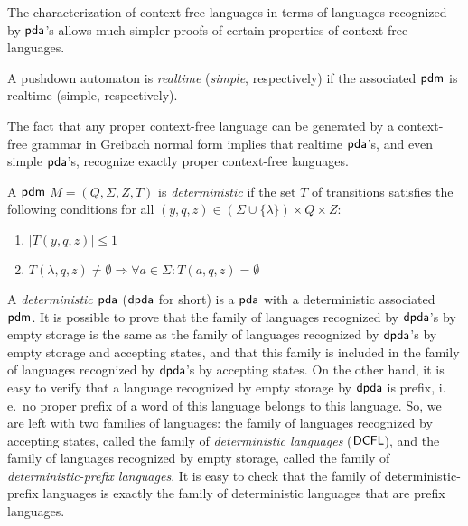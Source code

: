 The characterization of context-free languages in terms of languages recognized by \index{$\pda$}$\pda$'s allows much simpler proofs of certain properties of context-free languages.

A pushdown automaton is \emph{realtime} (\emph{simple}, respectively) if the associated \index{$\pdm$}$\pdm$ is realtime (simple, respectively).

The fact that any proper context-free language can be generated by a context-free grammar in Greibach normal form implies that realtime \index{$\pda$}$\pda$'s, and even simple \index{$\pda$}$\pda$'s, recognize exactly proper context-free languages.

A \index{$\pdm$}$\pdm$ $M = (Q, \Sigma, Z, T)$ is \emph{deterministic} if the set $T$ of transitions satisfies the following conditions for all $(y, q, z) \in (\Sigma \cup \{\lambda\}) \times Q \times Z$:

\begin{enumerate}
\item $|T(y, q, z)| \le 1$
\item $T(\lambda, q, z) \neq \emptyset \Rightarrow \forall a \in \Sigma: T(a, q, z) = \emptyset$
\end{enumerate}

A \emph{deterministic $\pda$} \index{$\dpda$}($\dpda$ for short) is a $\pda$ with a deterministic associated \index{$\pdm$}$\pdm$. It is possible to prove that the family of languages recognized by $\dpda$'s by empty storage is the same as the family of languages recognized by $\dpda$'s by empty storage and accepting states, and that this family is included in the family of languages recognized by $\dpda$'s by accepting states. On the other hand, it is easy to verify that a language recognized by empty storage by $\dpda$ is prefix, i.\,e.\ no proper prefix of a word of this language belongs to this language. So, we are left with two families of languages: the family of languages recognized by accepting states, called the family of \emph{deterministic languages} \index{$\DCFL$}($\DCFL$), and the family of languages recognized by empty storage, called the family of  \emph{deterministic-prefix languages}. It is easy to check that the family of deterministic-prefix languages is exactly the family of deterministic languages that are prefix languages.

